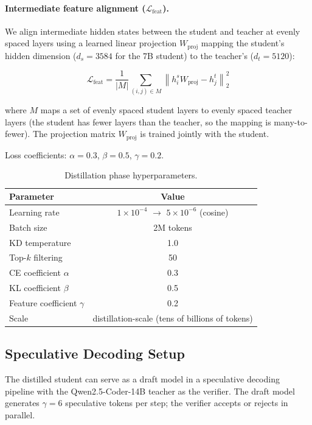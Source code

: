 \documentclass[11pt,a4paper]{article}
\begin{document}
\paragraph{Intermediate feature alignment ($\mathcal{L}_{\text{feat}}$).}
We align intermediate hidden states between the student and teacher at evenly spaced layers
using a learned linear projection $W_{\text{proj}}$ mapping the student's hidden dimension
($d_s = 3584$ for the 7B student) to the teacher's ($d_t = 5120$):

\begin{equation}
  \mathcal{L}_{\text{feat}} = \frac{1}{|M|} \sum_{(i,j) \in M} \left\| h^s_i W_{\text{proj}} - h^t_j \right\|_2^2
\end{equation}

where $M$ maps a set of evenly spaced student layers to evenly spaced teacher layers (the student has
fewer layers than the teacher, so the mapping is many-to-fewer). The projection matrix $W_{\text{proj}}$
is trained jointly with the student.

Loss coefficients: $\alpha = 0.3$, $\beta = 0.5$, $\gamma = 0.2$.

\begin{table}[H]
\centering
\caption{Distillation phase hyperparameters.}
\label{tab:kd}
\begin{tabular}{lc}
\toprule
\textbf{Parameter} & \textbf{Value} \\
\midrule
Learning rate      & $1 \times 10^{-4}$ $\to$ $5 \times 10^{-6}$ (cosine) \\
Batch size         & 2M tokens \\
KD temperature     & 1.0 \\
Top-$k$ filtering  & 50 \\
CE coefficient $\alpha$ & 0.3 \\
KL coefficient $\beta$  & 0.5 \\
Feature coefficient $\gamma$ & 0.2 \\
Scale              & distillation-scale (tens of billions of tokens) \\
\bottomrule
\end{tabular}
\end{table}

\subsection{Speculative Decoding Setup}

The distilled student can serve as a draft model in a speculative decoding pipeline with the
Qwen2.5-Coder-14B teacher \cite{qwen25coder} as the verifier. The draft model generates $\gamma = 6$
speculative tokens per step; the verifier accepts or rejects in parallel.
\end{document}
